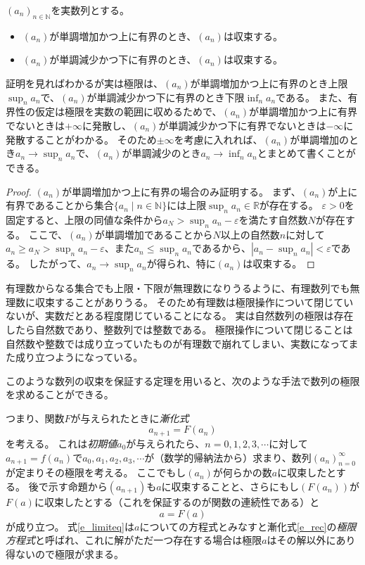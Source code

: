 \begin{theorem}[単調収束定理]
\label{t_mono_conv}
$(a_n)_{n \in \mathbb{N}}$を実数列とする。
\begin{itemize}
\item
$(a_n)$が単調増加かつ上に有界のとき、$(a_n)$は収束する。
\item
$(a_n)$が単調減少かつ下に有界のとき、$(a_n)$は収束する。
\end{itemize}
\end{theorem}

\begin{remark}
証明を見ればわかるが実は極限は、$(a_n)$が単調増加かつ上に有界のとき上限$\sup_n a_n$で、$(a_n)$が単調減少かつ下に有界のとき下限$\inf_n a_n$である。
また、有界性の仮定は極限を実数の範囲に収めるためで、$(a_n)$が単調増加かつ上に有界でないときは$+\infty$に発散し、$(a_n)$が単調減少かつ下に有界でないときは$-\infty$に発散することがわかる。
そのため$\pm \infty$を考慮に入れれば、$(a_n)$が単調増加のとき$a_n \to \sup_n a_n$で、$(a_n)$が単調減少のとき$a_n \to \inf_n a_n$とまとめて書くことができる。
\end{remark}

\begin{proof}
$(a_n)$が単調増加かつ上に有界の場合のみ証明する。
まず、$(a_n)$が上に有界であることから集合$\{ a_n \mid n \in \mathbb{N} \}$には上限$\sup_n a_n \in \mathbb{R}$が存在する。
$\varepsilon > 0$を固定すると、上限の同値な条件から$a_N > \sup_n a_n-\varepsilon$を満たす自然数$N$が存在する。
ここで、$(a_n)$が単調増加であることから$N$以上の自然数$n$に対して$a_n \ge a_N > \sup_n a_n-\varepsilon$、また$a_n \le \sup_n a_n$であるから、$|a_n-\sup_n a_n| < \varepsilon$である。
したがって、$a_n \to \sup_n a_n$が得られ、特に$(a_n)$は収束する。
\end{proof}

有理数からなる集合でも上限・下限が無理数になりうるように、有理数列でも無理数に収束することがありうる。
そのため有理数は極限操作について閉じていないが、実数だとある程度閉じていることになる。
実は自然数列の極限は存在したら自然数であり、整数列では整数である。
極限操作について閉じることは自然数や整数では成り立っていたものが有理数で崩れてしまい、実数になってまた成り立つようになっている。

このような数列の収束を保証する定理を用いると、次のような手法で数列の極限を求めることができる。

つまり、関数$F$が与えられたときに\emph{漸化式}
\begin{equation}
\label{e_rec}
a_{n+1} = F(a_n)
\end{equation}
を考える。
これは\emph{初期値}$a_0$が与えられたら、$n = 0, 1, 2, 3, \cdots$に対して$a_{n+1} = f(a_n)$で$a_0, a_1, a_2, a_3, \cdots$が（数学的帰納法から）求まり、数列$(a_n)_{n = 0}^\infty$が定まりその極限を考える。
ここでもし$(a_n)$が何らかの数$a$に収束したとする。
後で示す命題から$(a_{n+1})$も$a$に収束することと、さらにもし$(F(a_n))$が$F(a)$に収束したとする（これを保証するのが関数の連続性である）と
\begin{equation}
\label{e_limiteq}
a = F(a)
\end{equation}
が成り立つ。
式\eqref{e_limiteq}は$a$についての方程式とみなすと漸化式\eqref{e_rec}の\emph{極限方程式}と呼ばれ、これに解がただ一つ存在する場合は極限$a$はその解以外にあり得ないので極限が求まる。

